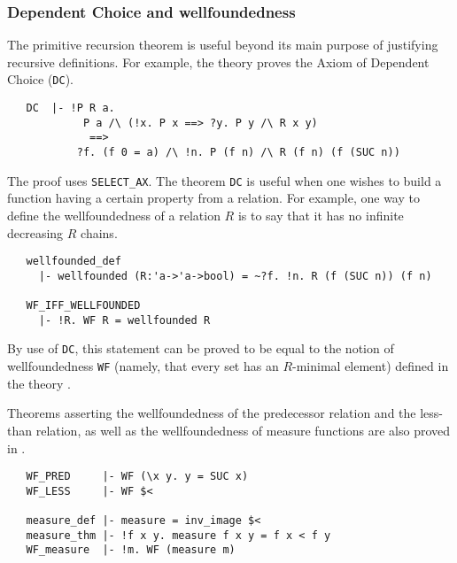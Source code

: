 \subsubsection{Dependent Choice and wellfoundedness}
\label{prim-rec-conseq}

The primitive recursion theorem is useful beyond its main purpose of
justifying recursive definitions. For example, the theory
 proves the Axiom of Dependent Choice ({\small\verb+DC+}).

\begin{hol}
{\small
\begin{verbatim}
   DC  |- !P R a.
            P a /\ (!x. P x ==> ?y. P y /\ R x y)
             ==>
           ?f. (f 0 = a) /\ !n. P (f n) /\ R (f n) (f (SUC n))
\end{verbatim}
}
\end{hol}

The proof uses {\small\verb+SELECT_AX+}. The theorem {\small\verb+DC+}
is useful when one wishes to build a function having a certain
property from a relation. For example, one way to define the
wellfoundedness of a relation $R$ is to say that it has no infinite
decreasing $R$ chains.
%
\begin{hol}
\begin{verbatim}
   wellfounded_def
     |- wellfounded (R:'a->'a->bool) = ~?f. !n. R (f (SUC n)) (f n)

   WF_IFF_WELLFOUNDED
     |- !R. WF R = wellfounded R
\end{verbatim}
\end{hol}
By use of {\small\verb+DC+}, this statement can be proved
to be equal to the notion of wellfoundedness {\small\verb+WF+}
(namely, that every set has an $R$-minimal element) defined in the theory
.

Theorems asserting the wellfoundedness of the predecessor relation and
the less-than relation, as well as the wellfoundedness of measure
functions are also proved in .

\begin{hol}
\begin{verbatim}
   WF_PRED     |- WF (\x y. y = SUC x)
   WF_LESS     |- WF $<

   measure_def |- measure = inv_image $<
   measure_thm |- !f x y. measure f x y = f x < f y
   WF_measure  |- !m. WF (measure m)
\end{verbatim}
\end{hol}


